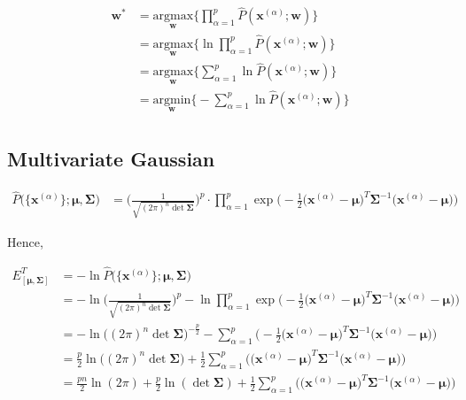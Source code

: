 \begin{align*}
	\boldsymbol{w}^* &= \underset{\boldsymbol{w}} {\text{argmax}} \bigg \{  \prod_{\alpha=1}^{p} 	\hat{P}( \boldsymbol{x}^{(\alpha)} ; \boldsymbol{w} )   \bigg \} \\
	&= \underset{\boldsymbol{w}} {\text{argmax}} \bigg \{  \ln \prod_{\alpha=1}^{p} 	\hat{P}( \boldsymbol{x}^{(\alpha)} ; \boldsymbol{w} )   \bigg \} \\
	&= \underset{\boldsymbol{w}} {\text{argmax}} \bigg \{  \sum_{\alpha=1}^{p} \ln \hat{P}( \boldsymbol{x}^{(\alpha)} ; \boldsymbol{w} )   \bigg \} \\
	&= \underset{\boldsymbol{w}} {\text{argmin}} \bigg \{  -\sum_{\alpha=1}^{p} \ln \hat{P}( \boldsymbol{x}^{(\alpha)} ; \boldsymbol{w} )   \bigg \} \\
\end{align*}

\subsection{Multivariate Gaussian}
\begin{align*}
	\hat{P} \big( \{ \boldsymbol{x}^{(\alpha)} \} ; \boldsymbol{\mu}, \boldsymbol{\Sigma} \big) &= \Bigg( \frac{1}{\sqrt{(2\pi)^n \det \boldsymbol{\Sigma}}} \Bigg)^p \cdot \prod_{\alpha=1}^p \exp{\Bigg( - \frac{1}{2} \big( \boldsymbol{x}^{(\alpha)} - \boldsymbol{\mu} \big)^T \boldsymbol{\Sigma}^{-1} \big( \boldsymbol{x}^{(\alpha)} - \boldsymbol{\mu} \big) \Bigg) }
\end{align*}

Hence, 

\begin{align*}
	E^T_{[ \boldsymbol{\mu}, \boldsymbol{\Sigma} ]} &= -\ln \hat{P} \big( \{ \boldsymbol{x}^{(\alpha)} \} ; \boldsymbol{\mu}, \boldsymbol{\Sigma} \big)  \\
	&= -\ln \Bigg( \frac{1}{\sqrt{(2\pi)^n \det \boldsymbol{\Sigma}}} \Bigg)^p  -\ln \prod_{\alpha=1}^p \exp{\Bigg( - \frac{1}{2} \big( \boldsymbol{x}^{(\alpha)} - \boldsymbol{\mu} \big)^T \boldsymbol{\Sigma}^{-1} \big( \boldsymbol{x}^{(\alpha)} - \boldsymbol{\mu} \big) \Bigg) } \\
	&= -\ln \bigg( (2\pi)^n \det \boldsymbol{\Sigma} \bigg)^{-\frac{p}{2}}  -\sum_{\alpha=1}^p \Bigg( - \frac{1}{2} \big( \boldsymbol{x}^{(\alpha)} - \boldsymbol{\mu} \big)^T \boldsymbol{\Sigma}^{-1} \big( \boldsymbol{x}^{(\alpha)} - \boldsymbol{\mu} \big) \Bigg) \\
	&= \frac{p}{2}\ln \bigg( (2\pi)^n \det \boldsymbol{\Sigma} \bigg)  + \frac{1}{2}\sum_{\alpha=1}^p \Bigg(  \big( \boldsymbol{x}^{(\alpha)} - \boldsymbol{\mu} \big)^T \boldsymbol{\Sigma}^{-1} \big( \boldsymbol{x}^{(\alpha)} - \boldsymbol{\mu} \big) \Bigg) \\
	&= \frac{pn}{2}\ln (2\pi) + \frac{p}{2} \ln (\det \boldsymbol{\Sigma} )  + \frac{1}{2}\sum_{\alpha=1}^p \Bigg(  \big( \boldsymbol{x}^{(\alpha)} - \boldsymbol{\mu} \big)^T \boldsymbol{\Sigma}^{-1} \big( \boldsymbol{x}^{(\alpha)} - \boldsymbol{\mu} \big) \Bigg) \\
\end{align*}

